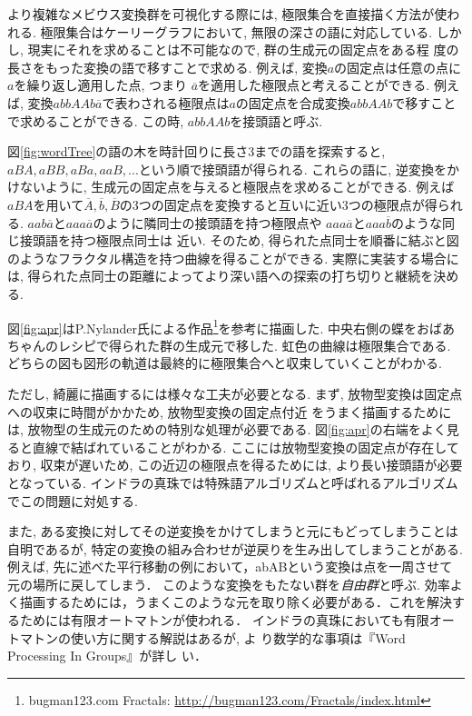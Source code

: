 より複雑なメビウス変換群を可視化する際には, 極限集合を直接描く方法が使わ
れる.
極限集合はケーリーグラフにおいて, 無限の深さの語に対応している.
しかし, 現実にそれを求めることは不可能なので, 群の生成元の固定点をある程
度の長さをもった変換の語で移すことで求める.
例えば, 変換$a$の固定点は任意の点に$a$を繰り返し適用した点, つまり
$\overline{a}$を適用した極限点と考えることができる.
例えば, 変換$abbAAb\overline{a}$で表わされる極限点は$a$の固定点を合成変換$abbAAb$で移すことで求めることができる.
この時, $abbAAb$を接頭語と呼ぶ.

図\ref{fig:wordTree}の語の木を時計回りに長さ3までの語を探索すると,$ aBA, aBB, aBa, aaB, ...$という順で接頭語が得られる.
これらの語に, 逆変換をかけないように, 生成元の固定点を与えると極限点を求めることができる.
例えば$aBA$を用いて$\overline{A}, \overline{b}, \overline{B}$の3つの固定点を変換すると互いに近い3つの極限点が得られる.
$aab\overline{a}$と$aaa\overline{a}$のように隣同士の接頭語を持つ極限点や
$aaa\overline{a}$と$aaa\overline{b}$のような同じ接頭語を持つ極限点同士は
近い.
そのため, 得られた点同士を順番に結ぶと図のようなフラクタル構造を持つ曲線を得ることができる.
実際に実装する場合には, 得られた点同士の距離によってより深い語への探索の打ち切りと継続を決める.

図\ref{fig:apr}はP.Nylander氏による作品\footnote{bugman123.com Fractals:
\url{http://bugman123.com/Fractals/index.html}}を参考に描画した.
中央右側の蝶をおばあちゃんのレシピで得られた群の生成元で移した.
虹色の曲線は極限集合である.
どちらの図も図形の軌道は最終的に極限集合へと収束していくことがわかる.

ただし, 綺麗に描画するには様々な工夫が必要となる.
まず, 放物型変換は固定点への収束に時間がかかため, 放物型変換の固定点付近
をうまく描画するためには, 放物型の生成元のための特別な処理が必要である.
図\ref{fig:apr}の右端をよく見ると直線で結ばれていることがわかる.
ここには放物型変換の固定点が存在しており, 収束が遅いため, この近辺の極限点を得るためには, より長い接頭語が必要となっている.
インドラの真珠では特殊語アルゴリズムと呼ばれるアルゴリズムでこの問題に対処する.

また, ある変換に対してその逆変換をかけてしまうと元にもどってしまうことは
自明であるが, 特定の変換の組み合わせが逆戻りを生み出してしまうことがある.
例えば, 先に述べた平行移動の例において，abABという変換は点を一周させて元の場所に戻してしまう．
このような変換をもたない群を\emph{自由群}と呼ぶ.
効率よく描画するためには，うまくこのような元を取り除く必要がある．これを解決するためには有限オートマトンが使われる．
インドラの真珠においても有限オートマトンの使い方に関する解説はあるが, よ
り数学的な事項は『Word Processing In Groups』\cite{wordProcessing}が詳し
い．

